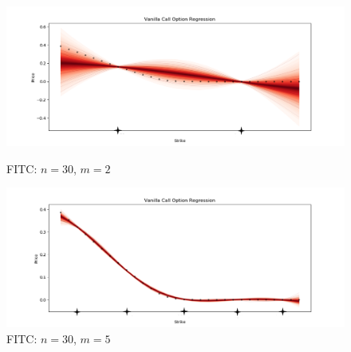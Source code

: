 \documentclass[12pt,a4paper,oneside]{book}
\begin{document}
\begin{figure}[!htb]
   \begin{minipage}{0.47\textwidth}
     \centering
     \includegraphics[width=1.1\linewidth]{full_bayesian_3}
     \caption*{FITC: $n=30$, $m=2$}\label{fig:bayesian_3}
   \end{minipage}\hfill
   \begin{minipage}{0.47\textwidth}
     \centering
     \includegraphics[width=1.1\linewidth]{full_bayesian_4}
     \caption*{FITC: $n=30$, $m=5$}\label{fig:bayesian_4}
   \end{minipage}\hfill
\end{figure}
\end{document}
